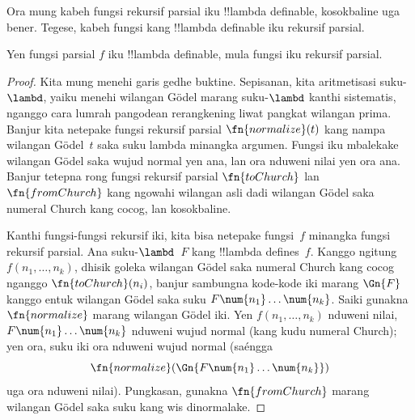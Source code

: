\documentclass[../../../include/open-logic-section]{subfiles}
\begin{document}

Ora mung kabeh fungsi rekursif parsial iku !!{lambda definable},
kosokbaline uga bener. Tegese, kabeh fungsi kang
!!{lambda definable} iku rekursif parsial.

\begin{thm}
   Yen fungsi parsial $f$ iku
  !!{lambda definable}, mula fungsi iku rekursif parsial.
\end{thm}

\begin{proof}
  Kita mung menehi garis gedhe buktine. Sepisanan, kita
  aritmetisasi suku-$\lambd$, yaiku menehi wilangan G\"odel
  marang suku-$\lambd$ kanthi sistematis, nganggo cara lumrah
  pangodean rerangkening liwat pangkat wilangan prima. Banjur
  kita netepake fungsi rekursif parsial $\fn{normalize}(t)$ kang
  nampa wilangan G\"odel~$t$ saka suku lambda minangka argumen.
  Fungsi iku mbalekake wilangan G\"odel saka wujud normal
  yen ana, lan ora nduweni nilai yen ora ana. Banjur tetepna
  rong fungsi rekursif parsial $\fn{toChurch}$ lan
  $\fn{fromChurch}$ kang ngowahi wilangan asli dadi wilangan
  G\"odel saka numeral Church kang cocog, lan kosokbaline.

  Kanthi fungsi-fungsi rekursif iki, kita bisa netepake fungsi~$f$
  minangka fungsi rekursif parsial. Ana suku-$\lambd$~$F$ kang
  !!{lambda define}s~$f$. Kanggo ngitung $f(n_1, \dots, n_k)$,
  dhisik goleka wilangan G\"odel saka numeral Church kang cocog
  nganggo $\fn{toChurch}(n_i)$, banjur sambungna kode-kode iki
  marang $\Gn{F}$ kanggo entuk wilangan G\"odel saka suku
  $F \num{n_1}\dots\num{n_k}$. Saiki gunakna $\fn{normalize}$
  marang wilangan G\"odel iki. Yen $f(n_1, \dots, n_k)$ nduweni
  nilai, $F \num{n_1}\dots\num{n_k}$ nduweni wujud normal
  (kang kudu numeral Church); yen ora, suku iki ora nduweni
  wujud normal (saéngga
  \[\fn{normalize}(\Gn{F\num{n_1}\dots\num{n_k}})\]
  uga ora nduweni nilai). Pungkasan, gunakna $\fn{fromChurch}$
  marang wilangan G\"odel saka suku kang wis dinormalake.
\end{proof}
\end{document}
